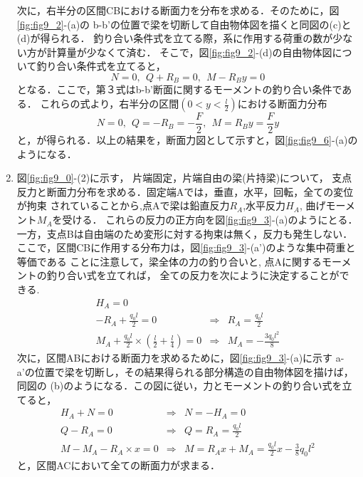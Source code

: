 \documentclass[10pt,a4j]{jbook}
\begin{document}
\begin{enumerate}
次に，右半分の区間CBにおける断面力を分布を求める．そのために，図\ref{fig:fig9_2}-(a)の
b-b'の位置で梁を切断して自由物体図を描くと同図の(c)と(d)が得られる．
釣り合い条件式を立てる際，系に作用する荷重の数が少ない方が計算量が少なくて済む．
そこで，図\ref{fig:fig9_2}-(d)の自由物体図について釣り合い条件式を立てると，
\begin{equation}
	N=0, \ \ Q+R_B=0, \ \ M-R_By=0
	\label{eqn:}
\end{equation}
となる．ここで，第３式はb-b'断面に関するモーメントの釣り合い条件である．
これらの式より，右半分の区間$(0<y<\frac{l}{2})$における断面力分布
\begin{equation}
	N=0, \ \ Q=-R_B=-\frac{F}{2}, \ \ M=R_By =\frac{F}{2}y
	\label{eqn:}
\end{equation}
と，が得られる．以上の結果を，断面力図として示すと，図\ref{fig:fig9_6}-(a)のようになる．
\item
図\ref{fig:fig9_0}-(2)に示す， 片端固定，片端自由の梁(片持梁)について，
支点反力と断面力分布を求める．固定端Aでは，垂直，水平，回転，全ての変位が拘束
されていることから,点Aで梁は鉛直反力$R_A$,水平反力$H_A$, 曲げモーメント$M_A$を受ける．
これらの反力の正方向を図\ref{fig:fig9_3}-(a)のようにとる．
一方，支点Bは自由端のため変形に対する拘束は無く，反力も発生しない．
ここで，区間CBに作用する分布力は，図\ref{fig:fig9_3}-(a')のような集中荷重と等価である
ことに注意して，梁全体の力の釣り合いと, 点Aに関するモーメントの釣り合い式を立てれば，
全ての反力を次にように決定することができる.
\begin{eqnarray}
	H_A=0 & &  \\
	-R_A+\frac{q_0l}{2}=0 &\Rightarrow & R_A=\frac{q_0l}{2} \\
	M_A+\frac{q_0l}{2}\times \left(\frac{l}{2}+\frac{l}{4}\right)=0
	& \Rightarrow & M_A=-\frac{3q_0l^2}{8}
\end{eqnarray}
次に，区間ABにおける断面力を求めるために，図\ref{fig:fig9_3}-(a)に示す
a-a'の位置で梁を切断し，その結果得られる部分構造の自由物体図を描けば，同図の
(b)のようになる．この図に従い，力とモーメントの釣り合い式を立てると，
\begin{eqnarray}
	H_A+N=0 
	& \Rightarrow & 
	N=-H_A=0
	\label{eqn:} \\
	Q-R_A=0 
	& \Rightarrow & 
	Q=R_A=\frac{q_0l}{2}
	\label{eqn:} \\
	M-M_A-R_A\times x =0 
	& \Rightarrow & 
	M=R_Ax+M_A= \frac{q_0l}{2}x-\frac{3}{8}q_0l^2 
	\label{eqn:}
\end{eqnarray}
と，区間ACにおいて全ての断面力が求まる．


\end{enumerate}
\end{document}
